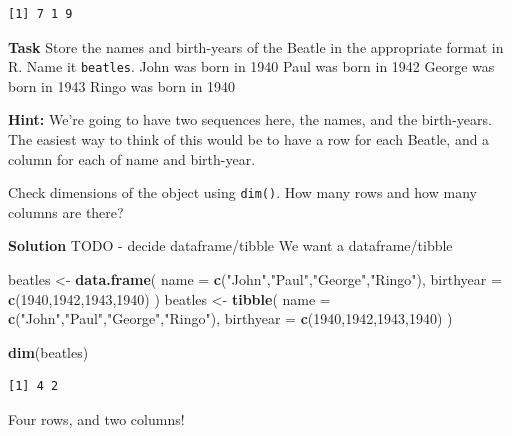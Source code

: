 \documentclass[12pt,]{krantz}
\newenvironment{Shaded}{\begin{snugshade}}{\end{snugshade}}
\newcommand{\DataTypeTok}[1]{\textcolor[rgb]{0.13,0.29,0.53}{#1}}
\newcommand{\DecValTok}[1]{\textcolor[rgb]{0.00,0.00,0.81}{#1}}
\newcommand{\KeywordTok}[1]{\textcolor[rgb]{0.13,0.29,0.53}{\textbf{#1}}}
\newcommand{\NormalTok}[1]{#1}
\newcommand{\StringTok}[1]{\textcolor[rgb]{0.31,0.60,0.02}{#1}}
\begin{document}
\begin{verbatim}
[1] 7 1 9
\end{verbatim}

\textbf{Task}
Store the names and birth-years of the Beatle in the appropriate format in R. Name it \texttt{beatles}.
John was born in 1940
Paul was born in 1942
George was born in 1943
Ringo was born in 1940

\textbf{Hint:} We're going to have two sequences here, the names, and the birth-years. The easiest way to think of this would be to have a row for each Beatle, and a column for each of name and birth-year.

Check dimensions of the object using \texttt{dim()}. How many rows and how many columns are there?

\textbf{Solution }
TODO - decide dataframe/tibble
We want a dataframe/tibble

\begin{Shaded}
\begin{Highlighting}[]
\NormalTok{beatles <-}\StringTok{ }
\StringTok{  }\KeywordTok{data.frame}\NormalTok{(}
    \DataTypeTok{name =} \KeywordTok{c}\NormalTok{(}\StringTok{"John"}\NormalTok{,}\StringTok{"Paul"}\NormalTok{,}\StringTok{"George"}\NormalTok{,}\StringTok{"Ringo"}\NormalTok{),}
    \DataTypeTok{birthyear =} \KeywordTok{c}\NormalTok{(}\DecValTok{1940}\NormalTok{,}\DecValTok{1942}\NormalTok{,}\DecValTok{1943}\NormalTok{,}\DecValTok{1940}\NormalTok{)}
\NormalTok{)}
\NormalTok{beatles <-}\StringTok{ }
\StringTok{  }\KeywordTok{tibble}\NormalTok{(}
    \DataTypeTok{name =} \KeywordTok{c}\NormalTok{(}\StringTok{"John"}\NormalTok{,}\StringTok{"Paul"}\NormalTok{,}\StringTok{"George"}\NormalTok{,}\StringTok{"Ringo"}\NormalTok{),}
    \DataTypeTok{birthyear =} \KeywordTok{c}\NormalTok{(}\DecValTok{1940}\NormalTok{,}\DecValTok{1942}\NormalTok{,}\DecValTok{1943}\NormalTok{,}\DecValTok{1940}\NormalTok{)}
\NormalTok{)}
\end{Highlighting}
\end{Shaded}

\begin{Shaded}
\begin{Highlighting}[]
\KeywordTok{dim}\NormalTok{(beatles)}
\end{Highlighting}
\end{Shaded}

\begin{verbatim}
[1] 4 2
\end{verbatim}

Four rows, and two columns!
\end{document}
